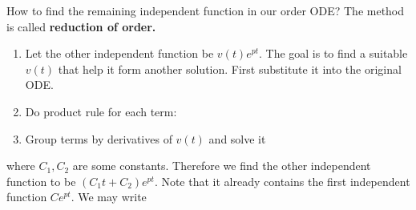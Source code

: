 \documentclass[class=article, crop=false, 12pt]{standalone}
\begin{document}
How to find the remaining independent function in our  order ODE? 
The method is called \bf{reduction of order}.

\begin{enumerate}
    \item Let the other independent function be $v(t)e^{pt}$. 
    The goal is to find a suitable $v(t)$ that help it form another solution. 
    First substitute it into the original ODE.

    \item Do product rule for each term:

    \item Group terms by derivatives of $v(t)$ and solve it
\end{enumerate}

where $C_1, C_2$ are some constants. 
Therefore we find the other independent function to be $(C_1t +C_2)e^{pt}$. 
Note that it already contains the first independent function $C e^{pt}$.
We may write 
\end{document}
